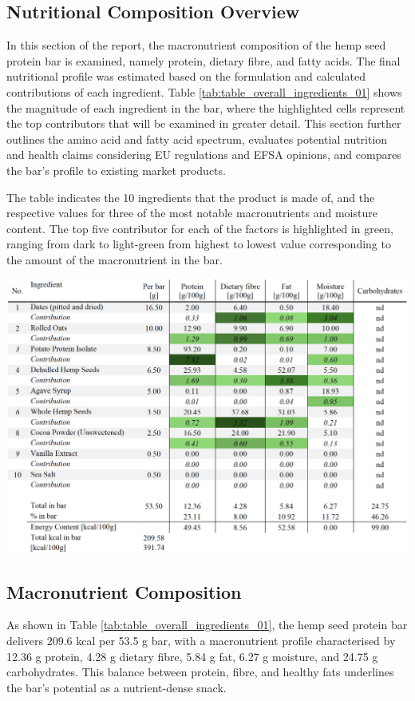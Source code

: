 \subsection{Nutritional Composition Overview}
In this section of the report, the macronutrient composition of the hemp seed protein bar is examined, namely protein, dietary fibre, and fatty acids. The final nutritional profile was estimated based on the formulation and calculated contributions of each ingredient. Table \ref*{tab:table_overall_ingredients_01} shows the magnitude of each ingredient in the bar, where the highlighted cells represent the top contributors that will be examined in greater detail. This section further outlines the amino acid and fatty acid spectrum, evaluates potential nutrition and health claims considering EU regulations and EFSA opinions, and compares the bar’s profile to existing market products.



    \begin{table}[H]
        \caption{The table indicates the 10 ingredients that the product is made of, and the respective values for three of the most notable macronutrients and moisture content. The top five contributor for each of the factors is highlighted in green, ranging from dark to light-green from highest to lowest value corresponding to the amount of the macronutrient in the bar. }
    \label{tab:table_overall_ingredients_01}
    \includegraphics[width=\linewidth]{Figures/tab_overall_ingredients_01.png}
\end{table}

\subsection{Macronutrient Composition}
As shown in Table \ref*{tab:table_overall_ingredients_01}, the hemp seed protein bar delivers 209.6 kcal per 53.5 g bar, with a macronutrient profile characterised by 12.36 g protein, 4.28 g dietary fibre, 5.84 g fat, 6.27 g moisture, and 24.75 g carbohydrates. This balance between protein, fibre, and healthy fats underlines the bar’s potential as a nutrient-dense snack.

